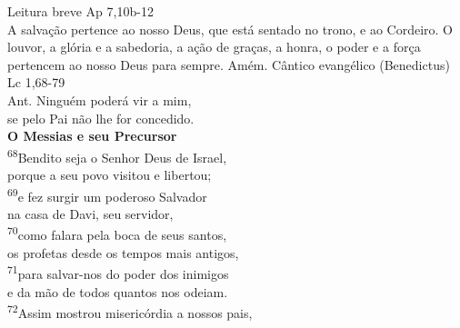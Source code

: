 \documentclass[opennany]{book}
\begin{document}
\begin{center}
    \textcolor{VioletRed2}{Leitura breve Ap 7,10b-12}
    \vspace{.2cm} \\
    A salvação pertence ao nosso Deus, que está sentado no trono, e ao Cordeiro. O louvor, a glória e a sabedoria, a ação de graças, a honra, o poder e a força pertencem ao nosso Deus para sempre. Amém.
    \newpage
    \textcolor{VioletRed2}{Cântico evangélico (Benedictus) \\ Lc 1,68-79}
    \vspace{.2cm} \\
    \textcolor{VioletRed2}{Ant.} Ninguém poderá vir a mim, \\
    se pelo Pai não lhe for concedido.
    \vspace{.2cm} \\
    \textbf{O Messias e seu Precursor}
    \vspace{.2cm} \\
    \textsuperscript{\underline{\hspace{.06in}}\textcolor{VioletRed2}{68}}Bendito seja o Senhor Deus de Israel, \textsuperscript{\gresixstar{}} \\
    porque a seu povo visitou e libertou;
    \vspace{.2cm} \\
    \textsuperscript{\underline{\hspace{.06in}}\textcolor{VioletRed2}{69}}e fez surgir um poderoso Salvador \textsuperscript{\gresixstar{}} \\
    na casa de Davi, seu servidor,
    \vspace{.2cm} \\
    \textsuperscript{\underline{\hspace{.06in}}\textcolor{VioletRed2}{70}}como falara pela boca de seus santos, \textsuperscript{\gresixstar{}} \\
    os profetas desde os tempos mais antigos,
    \vspace{.2cm} \\
    \textsuperscript{\underline{\hspace{.06in}}\textcolor{VioletRed2}{71}}para salvar-nos do poder dos inimigos \textsuperscript{\gresixstar{}} \\
    e da mão de todos quantos nos odeiam.
    \vspace{.2cm} \\
    \textsuperscript{\underline{\hspace{.06in}}\textcolor{VioletRed2}{72}}Assim mostrou misericórdia a nossos pais, \textsuperscript{\gresixstar{}} \\

\end{center}
\end{document}
